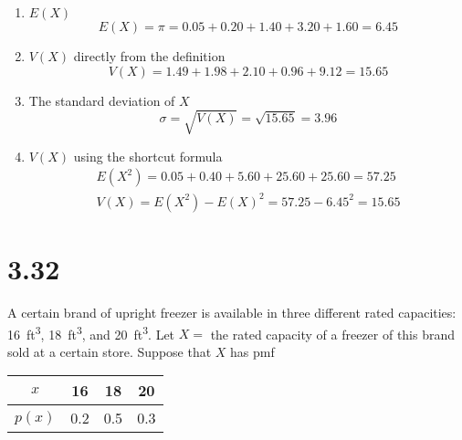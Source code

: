 \documentclass[letterpaper,12pt,fleqn]{article}
\begin{document}
\bigskip

\begin{enumerate}[label={\alph*)}]
\item \(E(X)\)
  \[E(X)=\pi=0.05+0.20+1.40+3.20+1.60=6.45\]
\item \(V(X)\) directly from the definition
  \[V(X)=1.49+1.98+2.10+0.96+9.12=15.65\]
\item The standard deviation of \(X\)
  \[\sigma=\sqrt{V(X)}=\sqrt{15.65}=3.96\]
\item \(V(X)\) using the shortcut formula
  \begin{gather*}
    E(X^2)=0.05+0.40+5.60+25.60+25.60=57.25 \\
    V(X)=E(X^2)-E(X)^2=57.25-6.45^2=15.65
  \end{gather*}
\end{enumerate}

\section*{3.32}

A certain brand of upright freezer is available in three different rated capacities: \SI{16}{ft^3}, \SI{18}{ft^3}, and
\SI{20}{ft^3}.  Let \(X=\) the rated capacity of a freezer of this brand sold at a certain store.  Suppose that \(X\) has
pmf

\bigskip

\begin{tabular}{c|ccc}
  \(x\) & 16 & 18 & 20 \\
  \hline
  \(p(x)\) & 0.2 & 0.5 & 0.3
\end{tabular}

\bigskip
\end{document}
